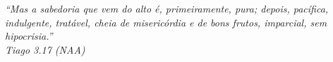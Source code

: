 \newpage
\thispagestyle{empty}

\vspace*{\fill}
\begin{flushright}
    {\itshape
    “Mas a sabedoria que vem do alto é, primeiramente, pura; depois, pacífica, indulgente, tratável, cheia de misericórdia e de bons frutos, imparcial, sem hipocrisia.”\\[0.5cm]
    \textemdash{} Tiago 3.17 (NAA)
    }
\end{flushright}
\vspace*{1cm}
